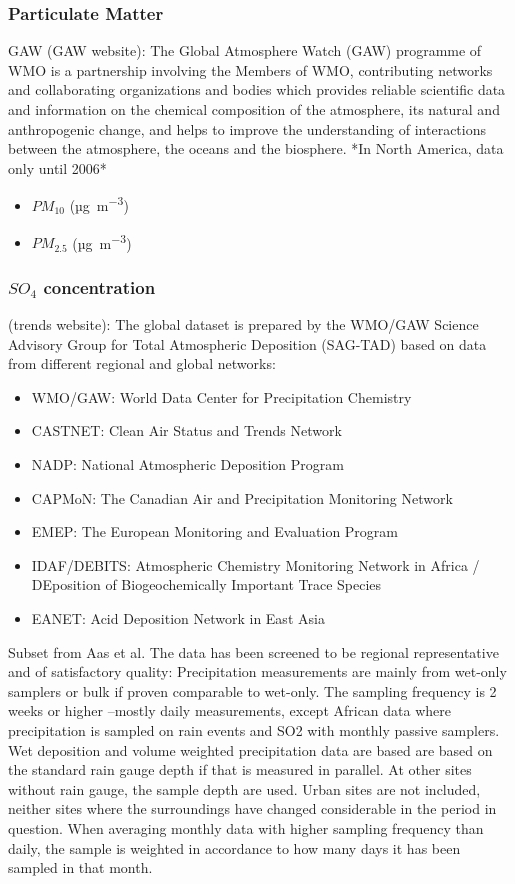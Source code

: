 \documentclass[journal abbreviation, manuscript]{copernicus}
\begin{document}
\subsubsection{Particulate Matter}
GAW (GAW website): The Global Atmosphere Watch (GAW) programme of WMO is a partnership involving the Members of WMO, contributing networks and collaborating organizations and bodies which provides reliable scientific data and information on the chemical composition of the atmosphere, its natural and anthropogenic change, and helps to improve the understanding of interactions between the atmosphere, the oceans and the biosphere.
*In North America, data only until 2006*
\begin{itemize}
 \item $PM_{10}$ (\unit{µg.m^{-3}})
 \item $PM_{2.5}$ (\unit{µg.m^{-3}})
\end{itemize}

\subsubsection{$SO_{4}$ concentration}
(trends website): The global dataset is prepared by the WMO/GAW Science Advisory Group for Total Atmospheric Deposition (SAG-TAD) based on data from different regional and global networks:
\begin{itemize}
 \item WMO/GAW: World Data Center for Precipitation Chemistry
 \item CASTNET: Clean Air Status and Trends Network
 \item NADP: National Atmospheric Deposition Program
 \item CAPMoN: The Canadian Air and Precipitation Monitoring Network
 \item EMEP: The European Monitoring and Evaluation Program
 \item IDAF/DEBITS: Atmospheric Chemistry Monitoring Network in Africa / DEposition of Biogeochemically Important Trace Species
 \item EANET: Acid Deposition Network in East Asia
\end{itemize}

Subset from Aas et al.
The data has been screened to be regional representative and of satisfactory quality:
Precipitation measurements are mainly from wet-only samplers or bulk if proven comparable to wet-only.
The sampling frequency is 2 weeks or higher –mostly daily measurements, except African data where precipitation is sampled on rain events and SO2 with monthly passive samplers.
Wet deposition and volume weighted precipitation data are based are based on the standard rain gauge depth if that is measured in parallel. At other sites without rain gauge, the sample depth are used.
Urban sites are not included, neither sites where the surroundings have changed considerable in the period in question.
When averaging monthly data with higher sampling frequency than daily, the sample is weighted in accordance to how many days it has been sampled in that month.
\end{document}
